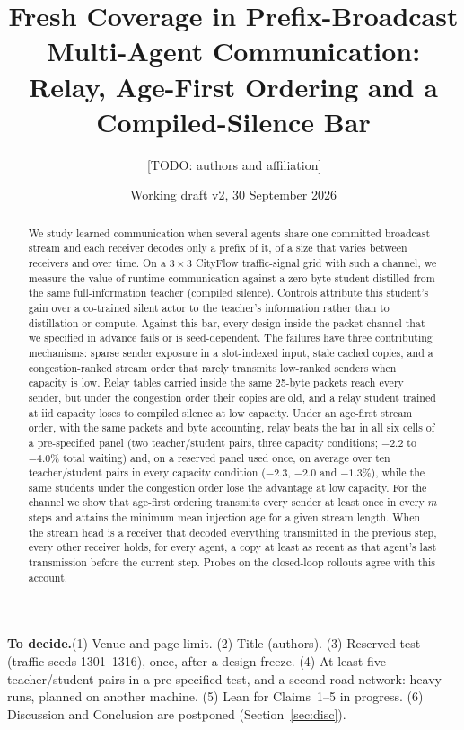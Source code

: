 \documentclass[11pt]{article}
\theoremstyle{definition}
\newif\ifshownotes\shownotestrue
\newcommand{\TODO}[1]{\ifshownotes{\color{todocol}\,\textsf{\footnotesize[TODO: #1]}}\fi}
\newcommand{\TODOPAR}[1]{\ifshownotes\par\vspace{2pt}\noindent%
  {\color{todocol}\textsf{\footnotesize\textbf{To decide.}\;#1}}\par\vspace{2pt}\fi}
\begin{document}
\sloppy
\title{Fresh Coverage in Prefix-Broadcast Multi-Agent Communication:\\ Relay, Age-First Ordering and a Compiled-Silence Bar}
\author{\TODO{authors and affiliation}}
\date{Working draft v2, 30 September 2026}
\maketitle

\TODOPAR{(1) Venue and page limit. (2) Title (authors). (3) Reserved test (traffic seeds 1301--1316), once, after a design
freeze. (4) At least five teacher/student pairs in a pre-specified test, and a second road network: heavy runs, planned on
another machine. (5) Lean for Claims~1--5 in progress. (6) Discussion and Conclusion are postponed (Section~\ref{sec:disc}).}

\begin{abstract}
We study learned communication when several agents share one committed broadcast stream and each receiver decodes only a
prefix of it, of a size that varies between receivers and over time. On a $3\times3$ CityFlow traffic-signal grid with such a
channel, we measure the value of runtime communication against a zero-byte student distilled from the same
full-information teacher (compiled silence). Controls attribute this student's gain over a co-trained silent actor to the
teacher's information rather than to distillation or compute. Against this bar, every design inside the packet channel
that we specified in advance fails or is seed-dependent. The failures have three contributing mechanisms: sparse sender
exposure in a slot-indexed input, stale cached copies, and a congestion-ranked stream order that rarely transmits
low-ranked senders when capacity is low. Relay tables carried inside the same 25-byte packets reach every sender, but under
the congestion order their copies are old, and a relay student trained at iid capacity loses to compiled silence at low
capacity. Under an age-first stream
order, with the same packets and byte accounting, relay beats the bar in all six cells of a pre-specified panel (two
teacher/student pairs, three capacity conditions; $-2.2$ to $-4.0\%$ total waiting) and, on a reserved panel used once, on
average over ten teacher/student pairs in every capacity condition ($-2.3$, $-2.0$ and $-1.3\%$), while the same students
under the congestion order lose the advantage at low capacity. For the channel we show that age-first
ordering transmits every sender at least once in every $m$ steps and attains the minimum mean injection age for a given
stream length. When the stream head is a receiver that decoded everything transmitted in the previous step, every other
receiver holds, for every agent, a copy at least as recent as that agent's last transmission before the current step.
Probes on the closed-loop rollouts agree with this account.
\end{abstract}
\end{document}
